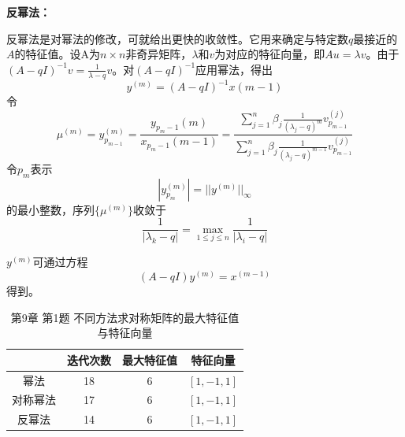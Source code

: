 \documentclass[12pt]{ctexart}
\begin{document}
	\textbf{反幂法：}
	
	反幂法是对幂法的修改，可就给出更快的收敛性。它用来确定与特定数$q$最接近的$A$的特征值。设A为$n\times n$非奇异矩阵，$\lambda$和$v$为对应的特征向量，即$Au=\lambda v$。由于$(A-qI)^{-1}v=\frac{1}{\lambda-q}v$。对$(A-qI)^{-1}$应用幂法，得出
	\begin{equation*}
	y^{(m)}=(A-qI)^{-1}x(m-1)
	\end{equation*}
	令
	\begin{equation*}
	\mu^{(m)}=y_{p_{m-1}}^{(m)}=\frac{y_{p_m-1}{(m)}}{x_{p_m-1}{(m-1)}}=\frac{\sum\limits_{j=1}^{n}\beta_j\frac{1}{(\lambda_j-q)^m}v_{p_{m-1}}^{(j)}}{\sum\limits_{j=1}^{n}\beta_j\frac{1}{(\lambda_j-q)^{m-1}}v_{p_{m-1}}^{(j)}}
	\end{equation*}
	令$p_m$表示
	\begin{equation*}
	|y_{p_m}^{(m)}|=||y^{(m)}||_\infty
	\end{equation*}
	的最小整数，序列$\{\mu^{(m)}\}$收敛于
	\begin{equation*}
	\frac{1}{|\lambda_k-q|}=\max\limits_{1\leq j\leq n}\frac{1}{|\lambda_i-q|}
	\end{equation*}
	
	$y^{(m)}$可通过方程
	\begin{equation*}
	(A-qI)y^{(m)}=x^{(m-1)}
	\end{equation*}得到。
	
	\begin{table}[htbp]
		\centering
		\caption{第9章 第1题 不同方法求对称矩阵的最大特征值与特征向量}\label{e9_1}
		\begin{tabular}
			{c|c|c|c}
			\hline
			&迭代次数&最大特征值&特征向量 \\
			\hline
			幂法&18&6&$[1,-1,1]$ \\
			\hline
			对称幂法&17&6&$[1,-1,1]$ \\
			\hline
			反幂法&14&6&$[1,-1,1]$ \\
			\hline
		\end{tabular}
	\end{table}
	
\end{document}
